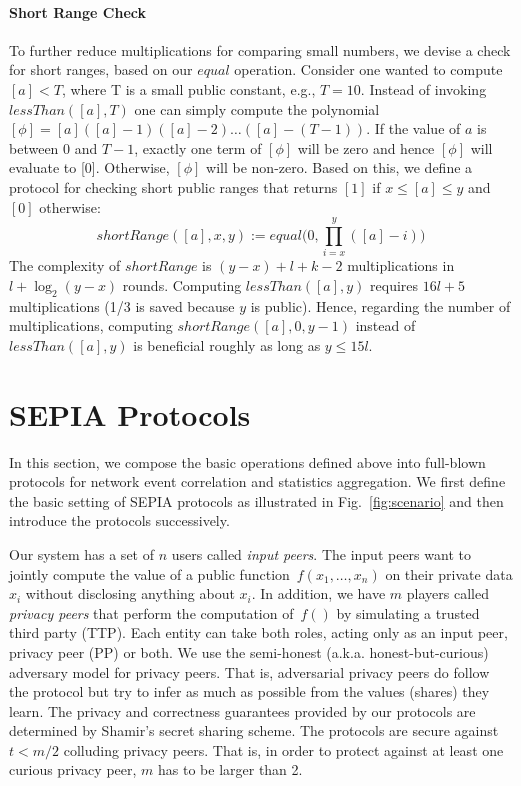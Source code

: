 \documentclass[letterpaper,11pt,onecolumn,titlepage]{article}
\begin{document}
\paragraph{Short Range Check}
To further reduce multiplications for comparing small numbers, we devise a check for short ranges, based on our $equal$ operation.
Consider one wanted to compute $[a]<T$, where T is a small public constant, e.g., $T=10$. Instead of invoking $lessThan([a],T)$ one can simply compute the polynomial
$[\phi]=[a]([a]-1)([a]-2)\ldots([a]-(T-1))$. If the value of $a$ is between $0$ and $T-1$, exactly one term of $[\phi]$ will be zero and hence $[\phi]$
will evaluate to [0]. Otherwise, $[\phi]$ will be non-zero. Based on this, we define a protocol for checking short public ranges that returns $[1]$ if $x \leq [a] \leq y$ and $[0]$ otherwise:
\begin{equation*}
shortRange([a], x, y) := equal \bigl(0, \prod_{i=x}^{y}{([a]-i)} \bigr)
\end{equation*}
The complexity of $shortRange$ is $(y-x)+l+k-2$ multiplications in $l+\log_2 (y-x)$ rounds. 
Computing $lessThan([a],y)$ requires $16l+5$ multiplications (1/3 is saved because $y$ is public).
Hence, regarding the number of multiplications, computing $shortRange([a],0,y-1)$ instead of $lessThan([a],y)$ is beneficial roughly as long as $y \leq 15l$.



\section{SEPIA Protocols}
\label{sec:protocols}

In this section, we compose the basic operations defined above into full-blown protocols for network event correlation and statistics aggregation.
We first define the basic setting of SEPIA protocols as illustrated in Fig.~\ref{fig:scenario} and then introduce the protocols successively.

Our system has a set of $n$ users called \emph{input peers}. The input peers want to jointly compute the value of a public function~$f(x_1,\ldots,x_n)$ on their private data $x_i$ without disclosing anything about $x_i$.
In addition, we have $m$ players called \emph{privacy peers} that perform the computation of~$f()$ by simulating
a trusted third party (TTP). Each entity can take both roles, acting only as an input peer, privacy peer (PP) or both.
We use the semi-honest (a.k.a. honest-but-curious) adversary model for privacy peers. That is, adversarial
privacy peers do follow the protocol but try to infer as much as possible from the values (shares) they learn. 
The privacy and correctness guarantees provided by our protocols are determined by Shamir's secret
sharing scheme.
The protocols are secure against $t < m/2$ colluding privacy peers. That is, in order to protect against at least one curious privacy peer, $m$ has to be larger than 2.
\end{document}
